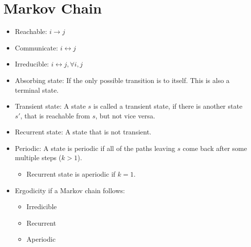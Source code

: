 

\section{Markov Chain}
\begin{itemize}
	\item Reachable: $i\to j$
	\item Communicate: $i\leftrightarrow j$
	\item Irreducible: $i\leftrightarrow j, \forall i,j$
	\item Absorbing state: If the only possible transition is to itself. This is also a terminal state.
	\item Transient state: A state $s$ is called a transient state, if there is another state $s'$, that is reachable from $s$, but not vice versa. 
	\item Recurrent state: A state that is not transient. 
	\item Periodic: A state is periodic if all of the paths leaving $s$ come back after some multiple steps ($k>1$). 
		\begin{itemize}
			\item Recurrent state is aperiodic if $k=1$.
		\end{itemize}
	\item Ergodicity if a Markov chain follows:
		\begin{itemize}
			\item Irredicible
			\item Recurrent
			\item Aperiodic
		\end{itemize}
\end{itemize}



